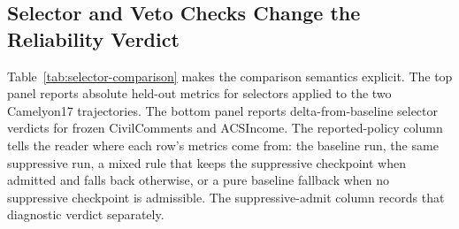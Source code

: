 \begin{table}[t]
  \centering
  \small
  \setlength{\tabcolsep}{3.5pt}
  
  \caption{
    Core workflow-hazard cases at P95.
    All deltas are baseline-referenced against the baseline-selected checkpoint from the undistorted run.
    Vision rows use held-out loss and calibration as primary reliability checks; ECE is held-out for the ERM anchors and validation-side for the Camelyon17 finetune anchor, matching the saved calibration artifacts.
    The tail/reliability diagnostic column is a teacher-tail stress diagnostic.
    CivilComments reports official WILDS worst-group loss, and ACSIncome reports tail MSE.
    CelebA ERM is transient; all other rows are persistent, with $\dagger$ marking a qualitative fixed-horizon tail check for Camelyon17 finetuning.
    Baseline held-out losses, for scale, are $0.211$ (Camelyon17 ERM), $1.557$ (CelebA ERM), $0.902$ (Camelyon17 finetune), and $0.258$ (CivilComments).
    Every row also satisfies proxy improvement relative to baseline.
    Appendix Tables~\ref{tab:seed-lure-dominance}--\ref{tab:seed-lure-paired} give seed counts and paired intervals for the classification anchors; the ACSIncome $10/10$ count is backed by the selector artifact.
    Bold marks the strongest ``accuracy up, reliability down'' pattern.
  }
  \label{tab:core-cases}
\end{table}

\subsection{Selector and Veto Checks Change the Reliability Verdict}
Table~\ref{tab:selector-comparison} makes the comparison semantics explicit.
The top panel reports absolute held-out metrics for selectors applied to the two Camelyon17 trajectories.
The bottom panel reports delta-from-baseline selector verdicts for frozen CivilComments and ACSIncome.
The reported-policy column tells the reader where each row's metrics come from: the baseline run, the same suppressive run, a mixed rule that keeps the suppressive checkpoint when admitted and falls back otherwise, or a pure baseline fallback when no suppressive checkpoint is admissible.
The suppressive-admit column records that diagnostic verdict separately.


